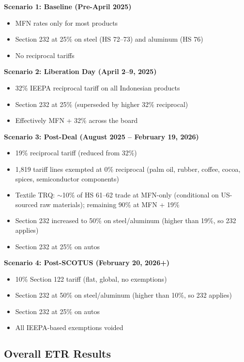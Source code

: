 \documentclass[12pt,a4paper]{article}
\begin{document}
\textbf{Scenario 1: Baseline (Pre-April 2025)}
\begin{itemize}
    \item MFN rates only for most products
    \item Section 232 at 25\% on steel (HS 72--73) and aluminum (HS 76)
    \item No reciprocal tariffs
\end{itemize}

\textbf{Scenario 2: Liberation Day (April 2--9, 2025)}
\begin{itemize}
    \item 32\% IEEPA reciprocal tariff on all Indonesian products
    \item Section 232 at 25\% (superseded by higher 32\% reciprocal)
    \item Effectively MFN + 32\% across the board
\end{itemize}

\textbf{Scenario 3: Post-Deal (August 2025 -- February 19, 2026)}
\begin{itemize}
    \item 19\% reciprocal tariff (reduced from 32\%)
    \item 1,819 tariff lines exempted at 0\% reciprocal (palm oil, rubber, coffee, cocoa, spices, semiconductor components)
    \item Textile TRQ: $\sim$10\% of HS 61--62 trade at MFN-only (conditional on US-sourced raw materials); remaining 90\% at MFN + 19\%
    \item Section 232 increased to 50\% on steel/aluminum (higher than 19\%, so 232 applies)
    \item Section 232 at 25\% on autos
\end{itemize}

\textbf{Scenario 4: Post-SCOTUS (February 20, 2026+)}
\begin{itemize}
    \item 10\% Section 122 tariff (flat, global, no exemptions)
    \item Section 232 at 50\% on steel/aluminum (higher than 10\%, so 232 applies)
    \item Section 232 at 25\% on autos
    \item All IEEPA-based exemptions voided
\end{itemize}

\subsection{Overall ETR Results}
\end{document}
